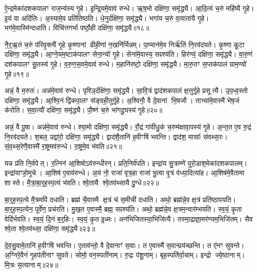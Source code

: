 ऐ॒न्द्रमेका॑दशकपालꣳ राज॒न्य॑स्य गृ॒हे।
इ॒न्द्रि॒यमे॒वाव॑ रुन्धे।
ऋ॒ष॒भो दक्षि॑णा॒ समृ॑द्ध्यै।
आ॒दि॒त्यं च॒रुं महि॑ष्यै गृ॒हे।
इ॒यं वा अदि॑तिः।
अ॒स्यामे॒व प्रति॑तिष्ठति।
धे॒नुर्दक्षि॑णा॒ समृ॑द्ध्यै।
भगा॑य च॒रुं वा॒वाता॑यै गृ॒हे।
भग॑मे॒वास्मि॑न्दधाति।
विचि॑त्तगर्भा पष्ठौ॒ही दक्षि॑णा॒ समृ॑द्ध्यै॥१८॥

नै॒र्॒ऋ॒तं च॒रुं प॑रिवृ॒क्त्यै॑ गृ॒हे कृ॒ष्णानां व्रीही॒णां न॒खनि॑र्भिन्नम्।
पा॒प्मान॑मे॒व निर्\mbox{}ऋ॑तिं नि॒रव॑दयते।
कृ॒ष्णा कू॒टा दक्षि॑णा॒ समृ॑द्ध्यै।
आ॒ग्ने॒यम॒ष्टाक॑पालꣳ सेना॒न्यो॑ गृ॒हे।
सेना॑मे॒वास्य॒ सꣴश्य॑ति।
हिर॑ण्यं॒ दक्षि॑णा॒ समृ॑द्ध्यै।
वा॒रु॒णं दश॑कपालꣳ सू॒तस्य॑ गृ॒हे।
व॒रु॒ण॒स॒वमे॒वाव॑ रुन्धे।
म॒हानि॑रष्टो॒ दक्षि॑णा॒ समृ॑द्ध्यै।
मा॒रु॒तꣳ स॒प्तक॑पालं ग्राम॒ण्यो॑ गृ॒हे॥१९॥

अन्नं॒ वै म॒रुतः॑।
अन्न॑मे॒वाव॑ रुन्धे।
पृश्ञि॒र्दक्षि॑णा॒ समृ॑द्ध्यै।
सा॒वि॒त्रं द्वाद॑शकपालं क्ष॒त्तुर्गृ॒हे प्रसूत्यै।
उ॒प॒ध्व॒स्तो दक्षि॑णा॒ समृ॑द्ध्यै।
आ॒श्वि॒नं द्वि॑कपा॒लꣳ स॑ङ्ग्रही॒तुर्गृ॒हे।
अ॒श्विनौ॒ वै दे॒वानां भि॒षजौ।
ताभ्या॑मे॒वास्मै॑ भेष॒जं क॑रोति।
स॒वा॒त्यौ॑ दक्षि॑णा॒ समृ॑द्ध्यै।
पौ॒ष्णं च॒रुं भा॑गदु॒घस्य॑ गृ॒हे॥२०॥

अन्नं॒ वै पू॒षा।
अन्न॑मे॒वाव॑ रुन्धे।
श्या॒मो दक्षि॑णा॒ समृ॑द्ध्यै।
रौ॒द्रं गा॑वीधु॒कं च॒रुम॑क्षावा॒पस्य॑ गृ॒हे।
अ॒न्त॒त ए॒व रु॒द्रं नि॒रव॑दयते।
श॒बल॒ उद्वा॑रो॒ दक्षि॑णा॒ समृ॑द्ध्यै।
द्वाद॑शै॒तानि॑ ह॒वीꣳषि॑ भवन्ति।
द्वाद॑श॒ मासाः᳚ संवथ्स॒रः।
सं॒व॒थ्स॒रेणै॒वास्मै॑ रा॒ष्ट्रमव॑रुन्धे।
रा॒ष्ट्रमे॒व भ॑वति॥२१॥

यन्न प्र॑ति नि॒र्वपेत्।
र॒त्निन॑ आ॒शिषो\-ऽव॑रुन्धीरन्।
प्रति॒निर्व॑पति।
इन्द्रा॑य सु॒त्राम्णे॑ पुरो॒डाश॒मेका॑दशकपालम्।
इन्द्रा॑याꣳहो॒मुचे।
आ॒शिष॑ ए॒वाव॑रुन्धे।
अ॒यं नो॒ राजा॑ वृत्र॒हा राजा॑ भू॒त्वा वृ॒त्रं व॑ध्या॒दित्या॑ह।
आ॒शिष॑मे॒वैतामा शास्ते।
मै॒त्रा॒बा॒र्॒ह॒स्प॒त्यं भ॑वति।
श्वे॒तायै श्वे॒तव॑थ्सायै दु॒ग्धे॥२२॥

बा॒र्॒ह॒स्प॒त्ये मै॒त्रमपि॑ दधाति।
ब्रह्म॑ चै॒वास्मै क्ष॒त्रं च॑ स॒मीची॑ दधाति।
अथो॒ ब्रह्म॑न्ने॒व क्ष॒त्रं प्रति॑ष्ठापयति।
बा॒र्॒ह॒स्प॒त्येन॒ पूर्वे॑ण॒ प्रच॑रति।
मु॒ख॒त ए॒वास्मै॒ ब्रह्म॒ सꣴश्य॑ति।
अथो॒ ब्रह्म॑न्ने॒व क्ष॒त्रम॒न्वार॑म्भयति।
स्व॒यं॒ कृ॒ता वेदि॑र्भवति।
स्व॒यं॒ दि॒नं ब॒र्॒हिः।
स्व॒यं॒ कृ॒त इ॒ध्मः।
अन॑भिजितस्या॒भिजि॑त्यै।
तस्मा॒द्राज्ञा॒मर॑ण्यम॒भिजि॑तम्।
सैव श्वे॒ता श्वे॒तव॑थ्सा॒ दक्षि॑णा॒ समृ॑द्ध्यै॥२३॥\anuvakamend[र॒त्नि॒त्वाय॒ समृ॑द्ध्यै पष्ठौ॒ही दक्षि॑णा॒ समृ॑द्ध्यै ग्राम॒ण्यो॑ गृ॒हे भा॑गदु॒घस्य॑ गृ॒हे भ॑वति दु॒ग्धे॑\-ऽभिजि॑त्यै॒ द्वे च॑]

दे॒व॒सु॒वामे॒तानि॑ ह॒वीꣳषि॑ भवन्ति।
ए॒ताव॑न्तो॒ वै दे॒वानाꣳ॑ स॒वाः।
त ए॒वास्मै॑ स॒वान्प्रय॑च्छन्ति।
त ए॑नꣳ सुवन्ते।
अ॒ग्निरे॒वैनं॑ गृ॒हप॑तीनाꣳ सुवते।
सोमो॒ वन॒स्पती॑नाम्।
रु॒द्रः प॑शू॒नाम्।
बृह॒स्पति॑र्वा॒चाम्।
इन्द्रो ज्ये॒ष्ठानाम्।
मि॒त्रः स॒त्यानाम्॥२४॥

